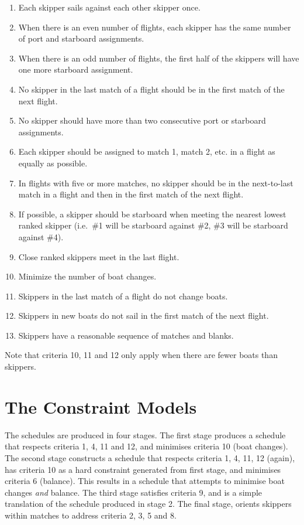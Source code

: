 \documentclass{llncs}
\begin{document}
\begin{enumerate}
\item Each skipper sails against each other skipper once.
\item When there is an even number of flights, each skipper has the same number
    of port and starboard assignments.
\item When there is an odd number of flights, the first half of the skippers
    will have one more starboard assignment.
\item No skipper in the last match of a flight should be in the first match of
    the next flight.
\item No skipper should have more than two consecutive port or starboard
    assignments.
\item Each skipper should be assigned to match 1, match 2, etc. in a flight as
    equally as possible.
\item In flights with five or more matches, no skipper should be in the
    next-to-last match in a flight and then in the first match of the next
    flight.
\item If possible, a skipper should be starboard when meeting the nearest
    lowest ranked skipper (i.e.\ \#1 will be starboard against \#2, \#3 will be
    starboard against \#4).
\item Close ranked skippers meet in the last flight.
\item Minimize the number of boat changes.
\item Skippers in the last match of a flight do not change boats.
\item Skippers in new boats do not sail in the first match of the next flight.
\item Skippers have a reasonable sequence of matches and blanks.
\end{enumerate}

Note that criteria 10, 11 and 12 only apply when there are fewer boats than
skippers.

\section{The Constraint Models}

The schedules are produced in four stages. The first stage produces a schedule
that respects criteria 1, 4, 11 and 12, and minimises criteria 10 (boat
changes). The second stage constructs a schedule that respects criteria 1, 4,
11, 12 (again), has criteria 10 as a hard constraint generated from first
stage, and minimises criteria 6 (balance). This results in a schedule that
attempts to minimise boat changes \emph{and} balance. The third stage satisfies
criteria 9, and is a simple translation of the schedule produced in stage 2.
The final stage, orients skippers within matches to address criteria 2, 3, 5
and 8.
\end{document}
